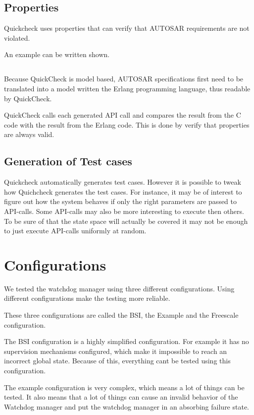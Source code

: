 \documentclass[a4paper]{article}
\begin{document}
\subsection{Properties}
Quickcheck uses properties that can verify that AUTOSAR requirements are not
violated.

An example can be written shown.

\subsection{}
Because QuickCheck is model based, AUTOSAR specifications first need
to be translated into a model written the Erlang programming language,
thus readable by QuickCheck.

QuickCheck calls each generated API call and compares the result from
the C code with the result from the Erlang code. This is done by verify that
properties are always valid.

\subsection{Generation of Test cases}
Quickcheck automatically generates test cases. However it is possible to tweak
how Quichcheck generates the test cases. For instance, it may be of interest to
figure out how the system behaves if only the right parameters are passed to
API-calls. Some API-calls may also be more interesting to execute then others.
To be sure of that the state space will actually be covered it may not be enough
to just execute API-calls uniformly at random.

\section{Configurations}
We tested the watchdog manager using three different
configurations. Using different configurations make the testing more
reliable.

These three configurations are called the BSI, the Example and the
Freescale configuration.

The BSI configuration is a highly simplified configuration. For
example it has no supervision mechanisms configured, which make it
impossible to reach an incorrect global state.
Because of this, everything cant be tested using this configuration.

The example configuration is very complex, which means a lot of things
can be tested. It also means that a lot of things can cause an invalid
behavior of the Watchdog manager and put the watchdog manager in an
absorbing failure state.
\end{document}
